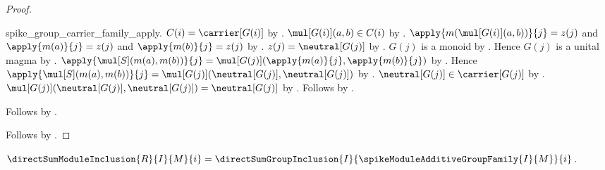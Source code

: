 \begin{proof}
\begin{subproof}
\begin{subproof}
\begin{byCase}
{                        spike_group_carrier_family_apply}.
                $C(i)=\carrier[G(i)]$ by
                    .
                $\mul[G(i)](a,b)\in C(i)$ by \auto.
                $\apply{m(\mul[G(i)](a,b))}{j}=z(j)$ and
                    $\apply{m(a)}{j}=z(j)$ and
                    $\apply{m(b)}{j}=z(j)$ by
                    .
                $z(j)=\neutral[G(j)]$ by
                    .
                $G(j)$ is a monoid by .
                Hence $G(j)$ is a unital magma by
                    .
                $\apply{\mul[S](m(a),m(b))}{j}
                    =\mul[G(j)](\apply{m(a)}{j},\apply{m(b)}{j})$ by
                    .
                Hence $\apply{\mul[S](m(a),m(b))}{j}
                    =\mul[G(j)](\neutral[G(j)],\neutral[G(j)])$ by
                    \auto.
                $\neutral[G(j)]\in\carrier[G(j)]$ by
                    .
                $\mul[G(j)](\neutral[G(j)],\neutral[G(j)])
                    =\neutral[G(j)]$ by .
                Follows by \auto.
            \end{byCase}
        \end{subproof}
        Follows by .
    \end{subproof}
    Follows by .
\end{proof}

\begin{definition}\label{spike_direct_sum_module_inclusion}
    $\directSumModuleInclusion{R}{I}{M}{i}
        =\directSumGroupInclusion
            {I}{\spikeModuleAdditiveGroupFamily{I}{M}}{i}$.
\end{definition}

